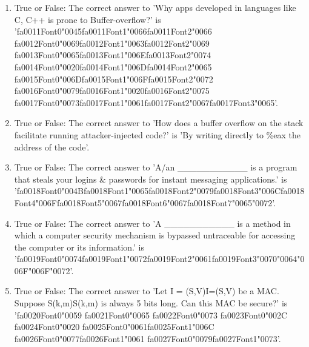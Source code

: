 \documentclass[12pt]{article}
\begin{document}
\begin{enumerate}[label=\arabic*.]
\item True or False: The correct answer to 'Why apps developed in languages like C, C++ is prone to Buffer-overflow?' is '{\csname fa0011Font0\endcsname\char"0045}{\csname fa0011Font1\endcsname\char"0066}{\csname fa0011Font2\endcsname\char"0066} {\csname fa0012Font0\endcsname\char"0069}{\csname fa0012Font1\endcsname\char"0063}{\csname fa0012Font2\endcsname\char"0069} {\csname fa0013Font0\endcsname\char"0065}{\csname fa0013Font1\endcsname\char"006E}{\csname fa0013Font2\endcsname\char"0074} {\csname fa0014Font0\endcsname\char"0020}{\csname fa0014Font1\endcsname\char"006D}{\csname fa0014Font2\endcsname\char"0065} {\csname fa0015Font0\endcsname\char"006D}{\csname fa0015Font1\endcsname\char"006F}{\csname fa0015Font2\endcsname\char"0072} {\csname fa0016Font0\endcsname\char"0079}{\csname fa0016Font1\endcsname\char"0020}{\csname fa0016Font2\endcsname\char"0075} {\csname fa0017Font0\endcsname\char"0073}{\csname fa0017Font1\endcsname\char"0061}{\csname fa0017Font2\endcsname\char"0067}{\csname fa0017Font3\endcsname\char"0065}'.
\item True or False: The correct answer to 'How does a buffer overflow on the stack facilitate running attacker-injected code?' is 'By writing directly to \%eax the address of the code'.
\item True or False: The correct answer to 'A/an \_\_\_\_\_\_\_\_\_\_\_ is a program that steals your logins \& passwords for instant messaging applications.' is '{\csname fa0018Font0\endcsname\char"004B}{\csname fa0018Font1\endcsname\char"0065}{\csname fa0018Font2\endcsname\char"0079}{\csname fa0018Font3\endcsname\char"006C}{\csname fa0018Font4\endcsname\char"006F}{\csname fa0018Font5\endcsname\char"0067}{\csname fa0018Font6\endcsname\char"0067}{\csname fa0018Font7\endcsname\char"0065}{\char"0072}'.
\item True or False: The correct answer to 'A \_\_\_\_\_\_\_\_\_\_\_ is a method in which a computer security mechanism is bypassed untraceable for accessing the computer or its information.' is '{\csname fa0019Font0\endcsname\char"0074}{\csname fa0019Font1\endcsname\char"0072}{\csname fa0019Font2\endcsname\char"0061}{\csname fa0019Font3\endcsname\char"0070}{\char"0064}{\char"006F}{\char"006F}{\char"0072}'.
\item True or False: The correct answer to 'Let I = (S,V)I=(S,V) be a MAC. Suppose S(k,m)S(k,m) is always 5 bits long. Can this MAC be secure?' is '{\csname fa0020Font0\endcsname\char"0059} {\csname fa0021Font0\endcsname\char"0065} {\csname fa0022Font0\endcsname\char"0073} {\csname fa0023Font0\endcsname\char"002C} {\csname fa0024Font0\endcsname\char"0020} {\csname fa0025Font0\endcsname\char"0061}{\csname fa0025Font1\endcsname\char"006C} {\csname fa0026Font0\endcsname\char"0077}{\csname fa0026Font1\endcsname\char"0061} {\csname fa0027Font0\endcsname\char"0079}{\csname fa0027Font1\endcsname\char"0073}'.
\end{enumerate}
\end{document}
